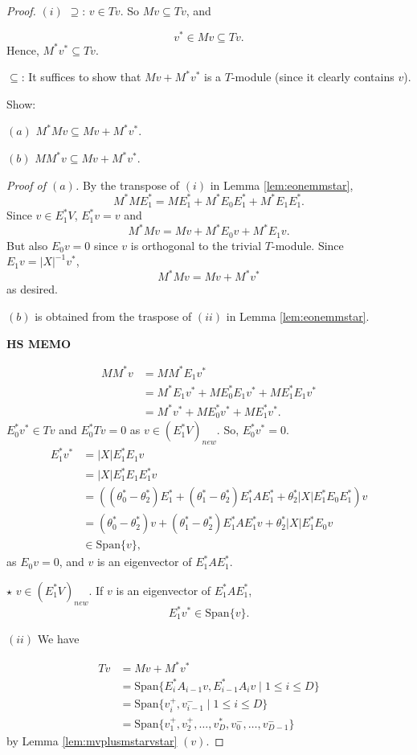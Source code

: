 \documentclass[
]{book}
\theoremstyle{definition}
\theoremstyle{definition}
\theoremstyle{definition}
\theoremstyle{definition}
\theoremstyle{remark}
\begin{document}
\begin{proof}
\leavevmode

\((i)\) \(\supseteq\): \(v\in Tv\). So \(Mv \subseteq Tv\), and

\[v^* \in Mv \subseteq Tv.\]
Hence, \(M^*v^* \subseteq Tv\).

\(\subseteq\): It suffices to show that \(Mv + M^*v^*\) is a \(T\)-module (since it clearly contains \(v\)).

Show:

\((a)\) \(M^*Mv \subseteq Mv + M^*v^*\).

\((b)\) \(MM^*v \subseteq Mv + M^*v^*\).

\emph{Proof of \((a)\).}
By the transpose of \((i)\) in Lemma \ref{lem:eonemmstar},
\[M^*ME^*_1 = ME^*_1 + M^*E_0E^*_1 + M^*E_1E^*_1.\]
Since \(v\in E^*_1V\), \(E^*_1v = v\) and
\[M^*Mv = Mv + M^*E_0v + M^*E_1v.\]
But also \(E_0v = 0\) since \(v\) is orthogonal to the trivial \(T\)-module.
Since \(E_1v = |X|^{-1}v^*\),
\[M^*Mv = Mv + M^*v^*\]
as desired.

\((b)\) is obtained from the traspose of \((ii)\) in Lemma \ref{lem:eonemmstar}.

\textbf{HS MEMO}

\begin{align}
MM^*v & = MM^*E_1v^*\\
& = M^*E_1v^* + ME^*_0E_1v^* + ME^*_1E_1v^*\\
& = M^*v^* + ME^*_0v^* + ME^*_1v^*.
\end{align}
\(E^*_0v^*\in Tv\) and \(E^*_0Tv = 0\) as \(v\in (E^*_1V)_{new}\). So, \(E^*_0v^* = 0\).
\begin{align}
E^*_1v^* & = |X|E^*_1E_1v \\
& = |X|E^*_1E_1E^*_1v\\
& = ((\theta^*_0-\theta^*_2)E^*_1 + (\theta^*_1-\theta^*_2)E^*_1AE^*_1 + \theta^*_2|X|E^*_1E_0E^*_1)v\\
& = (\theta^*_0-\theta^*_2)v + (\theta^*_1-\theta^*_2)E^*_1AE^*_1v + \theta^*_2|X|E^*_1E_0v\\
& \in \mathrm{Span}\{v\},
\end{align}
as \(E_0v = 0\), and \(v\) is an eigenvector of \(E^*_1AE^*_1\).

\(\star\) \(v\in (E^*_1V)_{new}\). If \(v\) is an eigenvector of \(E^*_1AE^*_1\),
\[E^*_1v^* \in \mathrm{Span}\{v\}.\]

\((ii)\) We have

\begin{align}
Tv & = Mv + M^*v^*\\
& = \mathrm{Span}\{E^*_iA_{i-1}v, E^*_{i-1}A_iv\mid 1\leq i\leq D\}\\
& = \mathrm{Span}\{v^+_i, v^-_{i-1}\mid 1\leq i\leq D\}\\
& = \mathrm{Span}\{v^+_1, v^+_2, \ldots, v^*_D, v_0^-, \ldots, v^-_{D-1}\}
\end{align}
by Lemma \ref{lem:mvplusmstarvstar} \((v)\).


\end{proof}
\end{document}

